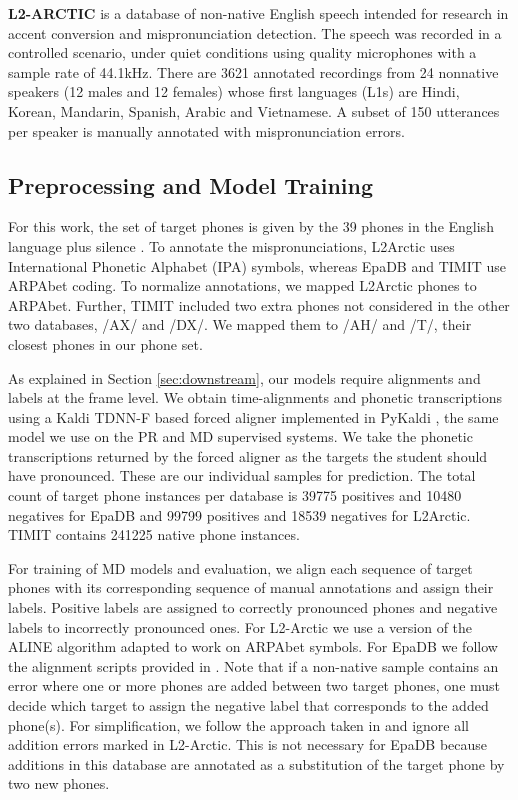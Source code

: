 \documentclass{INTERSPEECH2023}
\begin{document}
\textbf{L2-ARCTIC} \cite{zhao2018l2} is a database of non-native English speech intended for research in accent conversion and mispronunciation detection. The speech was recorded in a controlled scenario, under quiet conditions using quality microphones with a sample rate of 44.1kHz. There are 3621 annotated recordings from 24 nonnative speakers (12 males and 12 females) whose first languages (L1s) are Hindi, Korean, Mandarin, Spanish, Arabic and Vietnamese. A subset of 150 utterances per speaker is manually annotated with mispronunciation errors. 

\subsection{Preprocessing and Model Training}
\label{sec:preproc}
For this work, the set of target phones is given by the 39 phones in the English language plus silence \cite{TIMITphones}. To annotate the mispronunciations, L2Arctic uses International Phonetic Alphabet (IPA) symbols, whereas EpaDB and TIMIT use ARPAbet coding. To normalize annotations, we mapped L2Arctic phones to ARPAbet. Further, TIMIT included two extra phones not considered in the other two databases, /AX/ and /DX/. We mapped them to /AH/ and /T/, their closest phones in our phone set. 

As explained in Section \ref{sec:downstream}, our models require alignments and labels at the frame level. We obtain time-alignments and phonetic transcriptions using a Kaldi TDNN-F based forced aligner implemented in PyKaldi \cite{pykaldi}, the same model we use on the PR and MD supervised systems. We take the phonetic transcriptions returned by the forced aligner as the targets the student should have pronounced. These are our individual samples for prediction. The total count of target phone instances per database is 39775 positives and 10480 negatives for EpaDB and 99799 positives and 18539 negatives for L2Arctic. TIMIT contains 241225 native phone instances.

For training of MD models and evaluation, we align each sequence of target phones with its corresponding sequence of manual annotations and assign their labels. Positive labels are assigned to correctly pronounced phones and negative labels to incorrectly pronounced ones. For L2-Arctic we use a version of the ALINE algorithm \cite{kondrak2000new} adapted to work on ARPAbet symbols. For EpaDB we follow the alignment scripts provided in \cite{sancinetti2022transfer}. 
Note that if a non-native sample contains an error where one or more phones are added between two target phones, one must decide which target to assign the negative label that corresponds to the added phone(s). For simplification, we follow the approach taken in \cite{zhao2018l2} and ignore all addition errors marked in L2-Arctic. This is not necessary for EpaDB because additions in this database are annotated as a substitution of the target phone by two new phones. 
\end{document}
